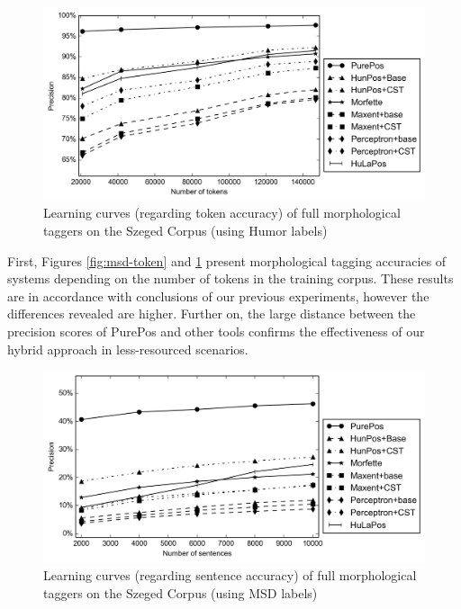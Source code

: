 \begin{figure}[H]
  \centering
  \includegraphics[width=1\textwidth]{MorphTagging/humor_token.png}
  \caption{Learning curves (regarding token accuracy) of full morphological taggers on the Szeged Corpus (using Humor labels)}
  \label{fig:humor-token}
\end{figure}

First, Figures \ref{fig:msd-token} and \ref{fig:humor-token} present morphological tagging accuracies of systems depending on the number of tokens in the training corpus. 
These results are in accordance with conclusions of our previous experiments, however the differences revealed are higher. 
Further on, the large distance between the precision scores of PurePos and other tools confirms the effectiveness of our  hybrid approach in less-resourced scenarios.

\begin{figure}[H]
  \centering
  \includegraphics[width=1\textwidth]{MorphTagging/msd_sent.png} 
  \caption{Learning curves (regarding sentence accuracy) of full morphological taggers on the Szeged Corpus (using MSD labels)}
  \label{fig:msd-sent}
\end{figure}

